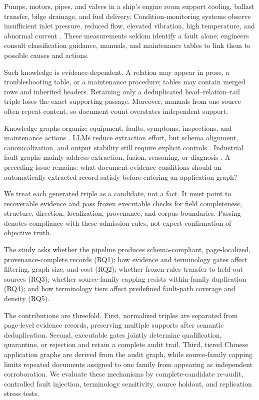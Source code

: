 \documentclass[conference,a4paper]{IEEEtran}
\begin{document}
Pumps, motors, pipes, and valves in a ship's engine room support cooling, ballast transfer, bilge drainage, and fuel delivery. Condition-monitoring systems observe insufficient inlet pressure, reduced flow, elevated vibration, high temperature, and abnormal current \cite{ABS2016,ABS2023}. These measurements seldom identify a fault alone; engineers consult classification guidance, manuals, and maintenance tables to link them to possible causes and actions.

Such knowledge is evidence-dependent. A relation may appear in prose, a troubleshooting table, or a maintenance procedure; tables may contain merged rows and inherited headers. Retaining only a deduplicated head--relation--tail triple loses the exact supporting passage. Moreover, manuals from one source often repeat content, so document count overstates independent support.

Knowledge graphs organize equipment, faults, symptoms, inspections, and maintenance actions \cite{Hogan2021,Ji2022}. LLMs reduce extraction effort, but schema alignment, canonicalization, and output stability still require explicit controls \cite{Zhang2024EDC}. Industrial fault graphs mainly address extraction, fusion, reasoning, or diagnosis \cite{Han2022,Cai2024,Wu2024}. A preceding issue remains: what document-evidence conditions should an automatically extracted record satisfy before entering an application graph?

We treat each generated triple as a candidate, not a fact. It must point to recoverable evidence and pass frozen executable checks for field completeness, structure, direction, localization, provenance, and corpus boundaries. Passing denotes compliance with these admission rules, not expert confirmation of objective truth.

The study asks whether the pipeline produces schema-compliant, page-localized, provenance-complete records (RQ1); how evidence and terminology gates affect filtering, graph size, and cost (RQ2); whether frozen rules transfer to held-out sources (RQ3); whether source-family capping resists within-family duplication (RQ4); and how terminology tiers affect predefined fault-path coverage and density (RQ5).

The contributions are threefold. First, normalized triples are separated from page-level evidence records, preserving multiple supports after semantic deduplication. Second, executable gates jointly determine qualification, quarantine, or rejection and retain a complete audit trail. Third, tiered Chinese application graphs are derived from the audit graph, while source-family capping limits repeated documents assigned to one family from appearing as independent corroboration. We evaluate these mechanisms by complete-candidate re-audit, controlled fault injection, terminology sensitivity, source holdout, and replication stress tests.
\end{document}
